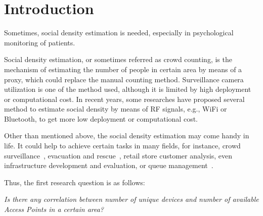 \chapter{Introduction}\label{ch:introduction}



Sometimes, social density estimation is needed, especially in psychological monitoring of patients.

Social density estimation, or sometimes referred as crowd counting, is the mechanism of estimating the number of people in certain area by means of a proxy, which could replace the manual counting method. Surveillance camera utilization is one of the method used, although it is limited by high deployment or computational cost. In recent years, some researches have proposed several method to estimate social density by means of RF signals, e.g., WiFi or Bluetooth, to get more low deployment or computational cost.

Other than mentioned above, the social density estimation may come handy in life. It could help to achieve certain tasks in many fields, for instance, crowd surveillance~\cite{thesis050}, evacuation and rescue~\cite{thesis045}, retail store customer analysis, even infrastructure development and evaluation, or queue management~\cite{thesis012}.




Thus, the first research question is as follows:
\begin{displayquote}\textit{
Is there any correlation between number of unique devices and number of available Access Points in a certain area?}
\end{displayquote}

